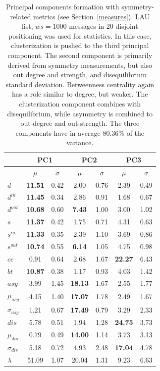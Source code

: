 \documentclass[%
 aip,
 jmp,%
 amsmath,amssymb,
 reprint,%
]{revtex4-1}
\begin{document}
\begin{table}
  \centering
  \caption{Principal components formation with symmetry-related metrics (see Section~\ref{measures}). LAU list, $ws=1000$ messages in 20 disjoint positioning was used for statistics. In this case, clusterization is pushed to the third principal component. The second component is primarily derived from symmetry measurements, but also out degree and strength, and disequilibrium standard deviation. Betweenness centrality again has a role similar to degree, but weaker. The clusterization component combines with disequilibrium, while asymmetry is combined to out-degree and out-strength. The three components have in average 80.36\% of the variance.}
  \begin{tabular}{|l|c|c| c|c| c|c|}\hline
 & \multicolumn{2}{c|}{PC1} & \multicolumn{2}{c|}{PC2} & \multicolumn{2}{c|}{PC3}  \\\hline
       & $\mu$ & $\sigma$ & $\mu$ & $\sigma$ & $\mu$ & $\sigma$  \\\hline
$d$            & {\bf 11.51} & 0.42 & 2.00  & 0.76 & 2.39  & 0.49 \\ 
$d^{in}$       & {\bf 11.45} & 0.34 & 2.86  & 0.91 & 1.68  & 0.67 \\
$d^{out}$      & {\bf 10.68} & 0.60 & {\bf 7.43}  & 1.00 & 3.00  & 1.02 \\
$s$            & {\bf 11.37} & 0.42 & 1.75  & 0.71 & 4.31  & 0.63 \\ 
$s^{in}$       & {\bf 11.33} & 0.35 & 2.39  & 1.10 & 3.69  & 0.86 \\ 
$s^{out}$      & {\bf 10.74} & 0.55 & {\bf 6.14}  & 1.05 & 4.75  & 0.98 \\ \hline
$cc$           & 0.91        & 0.64 & 2.68  & 1.67 & {\bf 22.27} & 6.43 \\ 
$bt$           & {\bf 10.87} & 0.38 & 1.17  & 0.93 & 4.03  & 1.42 \\ \hline
$asy$          & 3.99        & 1.45 & {\bf 18.13} & 1.67 & 2.55  & 1.77 \\
$\mu_{asy}$    & 4.15        & 1.40 & {\bf 17.07} & 1.78 & 2.49  & 1.67 \\
$\sigma_{asy}$ & 1.21        & 0.67 & {\bf 17.49} & 0.79 & 3.29  & 2.33 \\
$dis$          & 5.78        & 0.51 & 1.94  & 1.28 & {\bf 24.75} & 3.73 \\
$\mu_{dis}$    & 0.79        & 0.49 & {\bf 14.00} & 1.14 & 3.73  & 3.13 \\
$\sigma_{dis}$ & 5.18        & 0.72 & 4.93  & 2.48 & {\bf 17.04} & 4.78 \\ \hline
$\lambda$      & 51.09       & 1.07 & 20.04 & 1.31 & 9.23  & 6.63 \\ \hline
  \end{tabular}
  \label{compPCA2}
\end{table}
\end{document}
